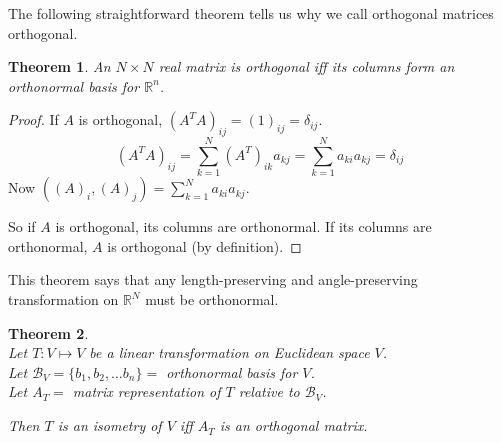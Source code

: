 \documentclass[twoside]{amsart}
\theoremstyle{plain}
\newtheorem{theorem}{Theorem}
\theoremstyle{definition}
\begin{document}
The following straightforward theorem tells us why we call orthogonal matrices orthogonal.  

\begin{theorem}\label{T:Orthogonal_Matrix_Orthogonal_Columns}
An $N \times N$ real matrix is orthogonal iff its columns form an orthonormal basis for $\mathbb{R}^n$.  
\end{theorem}

\begin{proof}
  If $A$ is orthogonal, $(A^T A)_{ij} = (\mathcal{1})_{ij} = \delta_{ij} $.  
\[
(A^T A)_{ij} = \sum_{k=1}^N (A^T)_{ik} a_{kj} = \sum_{k=1}^N a_{ki} a_{kj} = \delta_{ij}
\]
Now $((A)_i, (A)_j) = \sum_{k=1}^N a_{ki} a_{kj}$.  

So if $A$ is orthogonal, its columns are orthonormal.  If its columns are orthonormal, $A$ is orthogonal (by definition).  
\end{proof}

This theorem says that any length-preserving and angle-preserving transformation on $\mathbb{R}^N$ must be orthonormal.  

\begin{theorem} \quad \\
Let $T:V \mapsto V$ be a linear transformation on Euclidean space $V$.  \\
Let $\mathcal{B}_V = \{ b_1, b_2, \dots b_n \} = $ orthonormal basis for $V$.  \\
Let $A_T = $ matrix representation of $T$ relative to $\mathcal{B}_V$.  

Then $T$ is an isometry of $V$ iff $A_T$ is an orthogonal matrix.  
\end{theorem}
\end{document}
